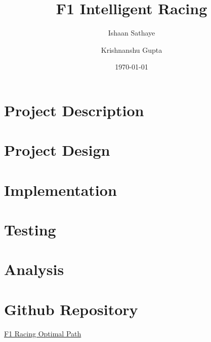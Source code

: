 \documentclass[12pt]{article}
\begin{document}
\title{F1 Intelligent Racing}

\author{%
   Ishaan Sathaye%
   \and%
   Krishnanshu Gupta%
}

\date{\today}

\maketitle



\section{Project Description}

\section{Project Design}

\section{Implementation}

\section{Testing}

\section{Analysis}

\section{Github Repository}
\href{https://github.com/Krishnanshu-Gupta/F1-Racing-Optimal-Path}{F1 Racing 
Optimal Path}
\end{document}
